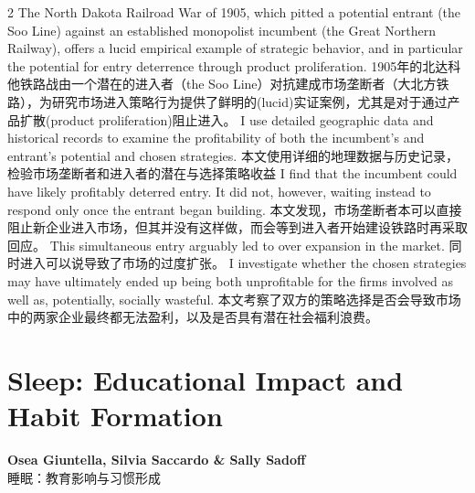 \documentclass[cn,hazy,blue,14pt,screen]{elegantnote}
\begin{document}
\begin{paracol}{2}
	The North Dakota Railroad War of 1905, which pitted a potential entrant (the Soo Line) against an established monopolist incumbent (the Great Northern Railway), offers a lucid empirical example of strategic behavior, and in particular the potential for entry deterrence through product proliferation. 
	\switchcolumn
	1905年的北达科他铁路战由一个潜在的进入者（the Soo Line）对抗建成市场垄断者（大北方铁路），为研究市场进入策略行为提供了鲜明的(lucid)实证案例，尤其是对于通过产品扩散(product proliferation)阻止进入。
	\switchcolumn*
	I use detailed geographic data and historical records to examine the profitability of both the incumbent’s and entrant’s potential and chosen strategies. 
	\switchcolumn
	本文使用详细的地理数据与历史记录，检验市场垄断者和进入者的潜在与选择策略收益
	\switchcolumn*
	I find that the incumbent could have likely profitably deterred entry. It did not, however, waiting instead to respond only once the entrant began building. 
	\switchcolumn
	本文发现，市场垄断者本可以直接阻止新企业进入市场，但其并没有这样做，而会等到进入者开始建设铁路时再采取回应。
	\switchcolumn*
	This simultaneous entry arguably led to over expansion in the market. 
	\switchcolumn
	同时进入可以说导致了市场的过度扩张。
	\switchcolumn*
	I investigate whether the chosen strategies may have ultimately ended up being both unprofitable for the firms involved as well as, potentially, socially wasteful.
	\switchcolumn
	本文考察了双方的策略选择是否会导致市场中的两家企业最终都无法盈利，以及是否具有潜在社会福利浪费。
\end{paracol}

\section{Sleep: Educational Impact and Habit Formation}
\begin{center}
	\textbf{Osea Giuntella, Silvia Saccardo \& Sally Sadoff}\\
	睡眠：教育影响与习惯形成
\end{center}
\end{document}
